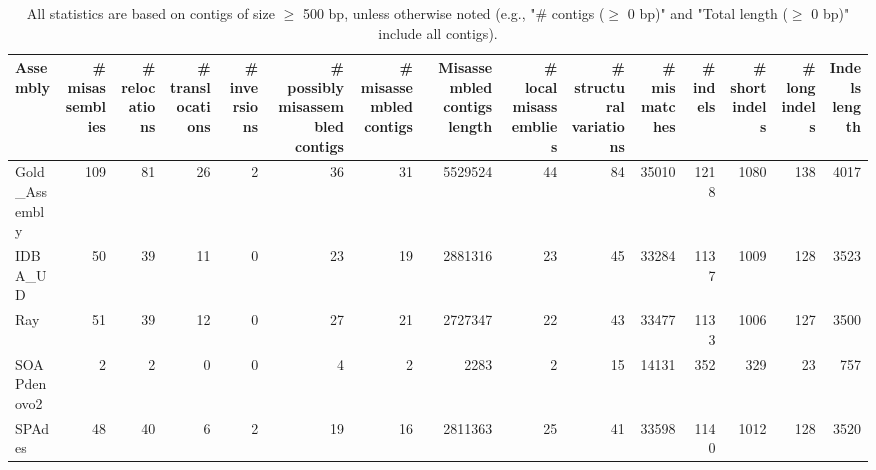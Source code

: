 \documentclass[12pt,a4paper]{article}
\begin{document}
\begin{table}[ht]
\begin{center}
\caption{All statistics are based on contigs of size $\geq$ 500 bp, unless otherwise noted (e.g., "\# contigs ($\geq$ 0 bp)" and "Total length ($\geq$ 0 bp)" include all contigs).}
\begin{tabular}{|l*{14}{|r}|}
\hline
Assembly & \# misassemblies &     \# relocations &     \# translocations &     \# inversions & \# possibly misassembled contigs & \# misassembled contigs & Misassembled contigs length & \# local misassemblies & \# structural variations & \# mismatches & \# indels &     \# short indels &     \# long indels & Indels length \\ \hline
Gold\_Assembly & 109 & 81 & 26 & 2 & 36 & 31 & 5529524 & 44 & 84 & 35010 & 1218 & 1080 & 138 & 4017 \\ \hline
IDBA\_UD & 50 & 39 & 11 & 0 & 23 & 19 & 2881316 & 23 & 45 & 33284 & 1137 & 1009 & 128 & 3523 \\ \hline
Ray & 51 & 39 & 12 & 0 & 27 & 21 & 2727347 & 22 & 43 & 33477 & 1133 & 1006 & 127 & 3500 \\ \hline
SOAPdenovo2 & 2 & 2 & 0 & 0 & 4 & 2 & 2283 & 2 & 15 & 14131 & 352 & 329 & 23 & 757 \\ \hline
SPAdes & 48 & 40 & 6 & 2 & 19 & 16 & 2811363 & 25 & 41 & 33598 & 1140 & 1012 & 128 & 3520 \\ \hline
\end{tabular}
\end{center}
\end{table}
\end{document}
